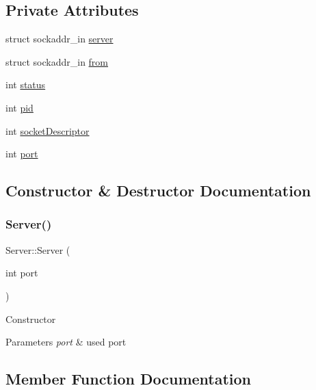 \subsection*{Private Attributes}
\begin{DoxyCompactItemize}
\item 
struct sockaddr\+\_\+in \mbox{\hyperlink{classServer_af10e93ccde1ccedd999726519b628f68}{server}}
\item 
struct sockaddr\+\_\+in \mbox{\hyperlink{classServer_a630123b8292df5f3947d82027ec7991b}{from}}
\item 
int \mbox{\hyperlink{classServer_a4073381c056bef47db16d0472c4b31a9}{status}}
\item 
int \mbox{\hyperlink{classServer_a519ae955c6db43f4b832626b8d7518a7}{pid}}
\item 
int \mbox{\hyperlink{classServer_a5e52b598760882795a7ea0aada7cb9b7}{socket\+Descriptor}}
\item 
int \mbox{\hyperlink{classServer_a926c9dae229a62b6d33fdbb41dca6d82}{port}}
\end{DoxyCompactItemize}


\subsection{Constructor \& Destructor Documentation}
\mbox{\label{classServer_a7d1fe6ba5f0fe9190a4f039662ea0e85}} 
\subsubsection{\texorpdfstring{Server()}{Server()}}
{\footnotesize\ttfamily Server\+::\+Server (\begin{DoxyParamCaption}\item[{int}]{port }\end{DoxyParamCaption})}

Constructor 
\begin{DoxyParams}{Parameters}
{\em port} & used port \\
\hline
\end{DoxyParams}


\subsection{Member Function Documentation}
\mbox{\label{classServer_a8d86edf1df9f12df07dc6e949d70f77f}} 

